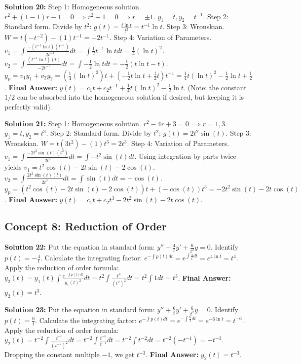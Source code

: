 \documentclass[11pt]{article}
\begin{document}
\textbf{Solution 20:}
Step 1: Homogeneous solution. $r^2 + (1-1)r - 1 = 0 \implies r^2 - 1 = 0 \implies r = \pm 1$. $y_1 = t, y_2 = t^{-1}$.
Step 2: Standard form. Divide by $t^2$: $g(t) = \frac{t \ln t}{t^2} = t^{-1} \ln t$.
Step 3: Wronskian. $W = t(-t^{-2}) - (1)t^{-1} = -2t^{-1}$.
Step 4: Variation of Parameters.
$v_1 = \int \frac{-(t^{-1} \ln t)(t^{-1})}{-2t^{-1}} dt = \int \frac{1}{2} t^{-1} \ln t dt = \frac{1}{4} (\ln t)^2$.
$v_2 = \int \frac{(t^{-1} \ln t)(t)}{-2t^{-1}} dt = \int -\frac{1}{2} \ln t dt = -\frac{1}{2}(t \ln t - t)$.
$y_p = v_1 y_1 + v_2 y_2 = \left(\frac{1}{4} (\ln t)^2\right)t + \left(-\frac{1}{2} t \ln t + \frac{1}{2} t\right)t^{-1} = \frac{1}{4} t (\ln t)^2 - \frac{1}{2} \ln t + \frac{1}{2}$.
\textbf{Final Answer:} $y(t) = c_1 t + c_2 t^{-1} + \frac{1}{4} t (\ln t)^2 - \frac{1}{2} \ln t$. (Note: the constant $1/2$ can be absorbed into the homogeneous solution if desired, but keeping it is perfectly valid).

\textbf{Solution 21:}
Step 1: Homogeneous solution. $r^2 - 4r + 3 = 0 \implies r=1, 3$. $y_1 = t, y_2 = t^3$.
Step 2: Standard form. Divide by $t^2$: $g(t) = 2t^2 \sin(t)$.
Step 3: Wronskian. $W = t(3t^2) - (1)t^3 = 2t^3$.
Step 4: Variation of Parameters.
$v_1 = \int \frac{-2t^2 \sin(t) (t^3)}{2t^3} dt = \int -t^2 \sin(t) dt$. Using integration by parts twice yields $v_1 = t^2 \cos(t) - 2t \sin(t) - 2\cos(t)$.
$v_2 = \int \frac{2t^2 \sin(t) (t)}{2t^3} dt = \int \sin(t) dt = -\cos(t)$.
$y_p = (t^2 \cos(t) - 2t \sin(t) - 2\cos(t))t + (-\cos(t))t^3 = -2t^2 \sin(t) - 2t \cos(t)$.
\textbf{Final Answer:} $y(t) = c_1 t + c_2 t^3 - 2t^2 \sin(t) - 2t \cos(t)$.

\subsection*{Concept 8: Reduction of Order}

\textbf{Solution 22:}
Put the equation in standard form: $y'' - \frac{4}{t}y' + \frac{6}{t^2}y = 0$. Identify $p(t) = -\frac{4}{t}$.
Calculate the integrating factor: $e^{-\int p(t)dt} = e^{\int \frac{4}{t} dt} = e^{4\ln t} = t^4$.
Apply the reduction of order formula:
$y_2(t) = y_1(t) \int \frac{e^{-\int p(t)dt}}{y_1(t)^2} dt = t^2 \int \frac{t^4}{(t^2)^2} dt = t^2 \int 1 dt = t^3$.
\textbf{Final Answer:} $y_2(t) = t^3$.

\textbf{Solution 23:}
Put the equation in standard form: $y'' + \frac{6}{t}y' + \frac{6}{t^2}y = 0$. Identify $p(t) = \frac{6}{t}$.
Calculate the integrating factor: $e^{-\int p(t)dt} = e^{-\int \frac{6}{t} dt} = e^{-6\ln t} = t^{-6}$.
Apply the reduction of order formula:
$y_2(t) = t^{-2} \int \frac{t^{-6}}{(t^{-2})^2} dt = t^{-2} \int \frac{t^{-6}}{t^{-4}} dt = t^{-2} \int t^{-2} dt = t^{-2}(-t^{-1}) = -t^{-3}$.
Dropping the constant multiple $-1$, we get $t^{-3}$.
\textbf{Final Answer:} $y_2(t) = t^{-3}$.
\end{document}
